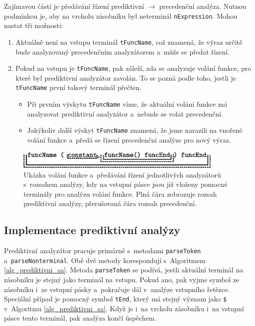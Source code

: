 Zajímavou částí je předávání řízení prediktivní $\rightarrow$ precedenční analýza.
Nutnou podmínkou je, aby na vrcholu zásobníku byl neterminál \texttt{nExpression}.
Mohou nastat tři možnosti:
\begin{enumerate}[label=\arabic*)]
    \item Aktuálně není na vstupu terminál \texttt{tFuncName}, což znamená, že výraz určitě bude analyzovaný precedenčním analyzátorem a~může se předat řízení.
    \item Pokud na vstupu je \texttt{tFuncName}, pak záleží, zda se analyzuje volání funkce, pro které byl prediktivní analyzátor zavolán.
    To se pozná podle toho, jestli je \texttt{tFuncName} první takový terminál přečten. 
    \begin{itemize}
        \item Při prvním výskytu \texttt{tFuncName} víme, že aktuální volání funkce má analyzovat prediktivní analyzátor a~nebude se volat precedenční.
        \item Jakýkoliv další výskyt \texttt{tFuncName} znamená, že jsme narazili na vnořené volání funkce a~předá se řízení precedenční analýze pro nový výraz.
    \end{itemize}  
\end{enumerate}

\begin{figure}[ht]
    \centering
    \includegraphics[width=0.9\textwidth]{obrazky-figures/volani_funkce.eps}
    \caption{Ukázka volání funkce a~předávání řízení jednotlivých analyzátorů s~rozsahem analýzy, kdy na vstupní pásce jsou již vloženy pomocné terminály pro analýzu volání funkce.
    Plná čára zobrazuje rozsah prediktivní analýzy, přerušovaná čára rozsah precedenční. }
    \label{hovno}
\end{figure}

\subsection*{Implementace prediktivní analýzy}
Prediktivní analyzátor pracuje primárně s~metodami \texttt{parseToken} a~\texttt{parseNonterminal}.
Obě dvě metody korespondují s~Algoritmem \ref{alg_prediktivni_sa}.
Metoda \texttt{parseToken} se podívá, jestli aktuální terminál na zásobníku je stejný jako terminál na vstupu.
Pokud ano, pak vyjme symbol ze zásobníku i~ze vstupní pásky a~pokračuje dál v~analýze vstupního řetězce.
Speciální případ je pomocný symbol \texttt{tEnd}, který má stejný význam jako \texttt{\$} v~Algoritmu \ref{alg_prediktivni_sa}.
Když je i~na vrcholu zásobníku i~na vstupní pásce tento terminál, pak analýza končí úspěchem.

